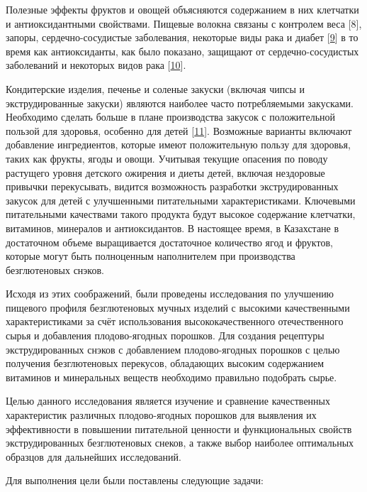 \begin{multicols}{2}
Полезные эффекты фруктов и овощей объясняются содержанием в них
клетчатки и антиоксидантными свойствами. Пищевые волокна связаны с
контролем веса {[}8{]}, запоры, сердечно-сосудистые заболевания,
некоторые виды рака и диабет
{[}\href{https://www.sciencedirect.com/science/article/pii/S002364381200463X\#bib23}{9}{]}
в то время как антиоксиданты, как было показано, защищают от
сердечно-сосудистых заболеваний и некоторых видов рака
{[}\href{https://www.sciencedirect.com/science/article/pii/S002364381200463X\#bib3}{10}{]}.

Кондитерские изделия, печенье и соленые закуски (включая чипсы и
экструдированные закуски) являются наиболее часто потребляемыми
закусками. Необходимо сделать больше в плане производства закусок с
положительной пользой для здоровья, особенно для детей
{[}\href{https://www.sciencedirect.com/science/article/pii/S002364381200463X\#bib37}{11}{]}.
Возможные варианты включают добавление ингредиентов, которые имеют
положительную пользу для здоровья, таких как фрукты, ягоды и овощи.
Учитывая текущие опасения по поводу растущего уровня детского ожирения и
диеты детей, включая нездоровые привычки перекусывать, видится
возможность разработки экструдированных закусок для детей с улучшенными
питательными характеристиками. Ключевыми питательными качествами такого
продукта будут высокое содержание клетчатки, витаминов, минералов и
антиоксидантов. В настоящее время, в Казахстане в достаточном объеме
выращивается достаточное количество ягод и фруктов, которые могут быть
полноценным наполнителем при производства безглютеновых снэков.

Исходя из этих соображений, были проведены исследования по улучшению
пищевого профиля безглютеновых мучных изделий с высокими качественными
характеристиками за счёт использования высококачественного
отечественного сырья и добавления плодово-ягодных порошков. Для создания
рецептуры экструдированных снэков с добавлением плодово-ягодных порошков
с целью получения безглютеновых перекусов, обладающих высоким
содержанием витаминов и минеральных веществ необходимо правильно
подобрать сырье.

Целью данного исследования является изучение и сравнение качественных
характеристик различных плодово-ягодных порошков для выявления их
эффективности в повышении питательной ценности и функциональных свойств
экструдированных безглютеновых снеков, а также выбор наиболее
оптимальных образцов для дальнейших исследований.

Для выполнения цели были поставлены следующие задачи:


\end{multicols}

